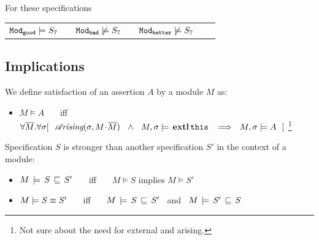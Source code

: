 {{ \noindent
 For  these specifications
 
 \begin{tabular}{lllllll}
${\texttt{Mod}}_{{\texttt{good}}}  \models S_7$  & & ${\texttt{Mod}}_{{\texttt{bad}}} \not\models S_7$ &&  ${\texttt{Mod}}_{{\texttt{better}}} \not\models S_7$ \\
\end{tabular}

\subsection{\SpecLang Implications}

\begin{definition} 
\label{def:assertion-inference-semantics}
We define satisfaction of an assertion $A$ by a  module $M$ as:
\begin{itemize}
\item
{
$M \vDash A$   \ \ \ iff \ \ \  $\forall \overline{M}. \forall \sigma
[\ \    \arising{\sigma}{M\madd\overline{M}}\   \  \wedge\ \  \satisfiesA {M}   {\sigma} {\external{\prg{this}}} 
\   \ \Longrightarrow \ \ \satisfiesA{M}{\sigma}{A}\ \ ]$
}\footnote{Not sure about the need for external and arising.}
\end{itemize}
\end{definition}


\begin{definition} 
\label{def:specification-implication-semantics}
Specification $S$ is stronger than another specification $S'$  in the context of a  module: 
 \begin{itemize}[itemsep=5pt]
\item 
$M\, \models\, S\, \sqsubseteq\, S'$   \ \ \ iff \ \ \  $M\models S$ implies $M \models S'$
\item
$M \models S  \equiv  S'$   \ \ \ iff \ \ \ $M\, \models\, S\, \sqsubseteq\, S'$  \ and \  $M\, \models\, S'\, \sqsubseteq\, S$    
\end{itemize}
\end{definition}

}}
